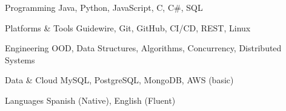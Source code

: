
\begin{cvskills}

  \cvskill
    {Programming}
    {Java, Python, JavaScript, C, C\#, SQL}

  \cvskill
    {Platforms \& Tools}
    {Guidewire, Git, GitHub, CI/CD, REST, Linux}

  \cvskill
    {Engineering}
    {OOD, Data Structures, Algorithms, Concurrency, Distributed Systems}

  \cvskill
    {Data \& Cloud}
    {MySQL, PostgreSQL, MongoDB, AWS (basic)}

  \cvskill
    {Languages}
    {Spanish (Native), English (Fluent)}

\end{cvskills}
